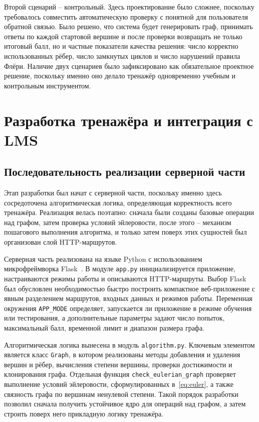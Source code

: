 \documentclass[a4paper,12pt]{extarticle}
\begin{document}
Второй сценарий -- контрольный. Здесь проектирование было сложнее, поскольку требовалось совместить автоматическую проверку с понятной для пользователя обратной связью. Было решено, что система будет генерировать граф, принимать ответы по каждой стартовой вершине и после проверки возвращать не только итоговый балл, но и частные показатели качества решения: число корректно использованных рёбер, число замкнутых циклов и число нарушений правила Флёри. Наличие двух сценариев было зафиксировано как обязательное проектное решение, поскольку именно оно делало тренажёр одновременно учебным и контрольным инструментом.

\section{Разработка тренажёра и интеграция с LMS}

\subsection{Последовательность реализации серверной части}

Этап разработки был начат с серверной части, поскольку именно здесь сосредоточена алгоритмическая логика, определяющая корректность всего тренажёра. Реализация велась поэтапно: сначала были созданы базовые операции над графом, затем проверка условий эйлеровости, после этого -- механизм пошагового выполнения алгоритма, и только затем поверх этих сущностей был организован слой HTTP-маршрутов.

Серверная часть реализована на языке Python с использованием микрофреймворка Flask~\cite{python3docs,flaskdocs}. В модуле \texttt{app.py} инициализируется приложение, настраиваются режимы работы и описываются HTTP-маршруты. Выбор Flask был обусловлен необходимостью быстро построить компактное веб-приложение с явным разделением маршрутов, входных данных и режимов работы. Переменная окружения \texttt{APP\_MODE} определяет, запускается ли приложение в режиме обучения или тестирования, а дополнительные параметры задают число попыток, максимальный балл, временной лимит и диапазон размера графа.

Алгоритмическая логика вынесена в модуль \texttt{algorithm.py}. Ключевым элементом является класс \texttt{Graph}, в котором реализованы методы добавления и удаления вершин и рёбер, вычисления степени вершины, проверки достижимости и клонирования графа. Отдельная функция \texttt{check\_eulerian\_graph} проверяет выполнение условий эйлеровости, сформулированных в~\eqref{eq:euler}, а также связность графа по вершинам ненулевой степени. Такой порядок разработки позволил сначала получить устойчивое ядро для операций над графом, а затем строить поверх него прикладную логику тренажёра.
\end{document}
